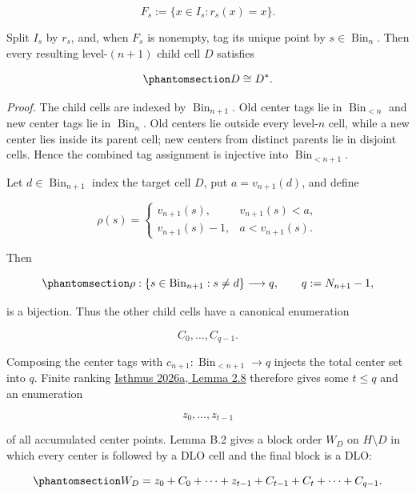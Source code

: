 \documentclass[
  english,
  11pt,
  reqno]{amsart}
\newcounter{none} %
\begin{document}
\[
F_s:=\{x\in I_s:r_s(x)=x\}.
\]

Split \(I_s\) by \(r_s\), and, when \(F_s\) is nonempty, tag its unique
point by \(s\in\operatorname{Bin}_n\). Then every resulting
level-\((n+1)\) child cell \(D\) satisfies

\begin{equation}\protect\phantomsection\label{eq:typefree-child-selfdual}{
D\cong D^*.
}\end{equation}

\emph{Proof.} The child cells are indexed by
\(\operatorname{Bin}_{n+1}\). Old center tags lie in
\(\operatorname{Bin}_{<n}\) and new center tags lie in
\(\operatorname{Bin}_n\). Old centers lie outside every level-\(n\)
cell, while a new center lies inside its parent cell; new centers from
distinct parents lie in disjoint cells. Hence the combined tag
assignment is injective into \(\operatorname{Bin}_{<n+1}\).

Let \(d\in\operatorname{Bin}_{n+1}\) index the target cell \(D\), put
\(a=v_{n+1}(d)\), and define

\[
\rho(s)
=
\begin{cases}
 v_{n+1}(s),&v_{n+1}(s)<a,\\
 v_{n+1}(s)-1,&a<v_{n+1}(s).
\end{cases}
\]

Then

\begin{equation}\protect\phantomsection\label{eq:typefree-remaining-cell-ranking}{
\rho:
\{s\in\operatorname{Bin}_{n+1}:s\ne d\}
\longrightarrow
q,
\qquad
q:=N_{n+1}-1,
}\end{equation}

is a bijection. Thus the other child cells have a canonical enumeration

\[
C_0,\ldots,C_{q-1}.
\]

Composing the center tags with
\(c_{n+1}:\operatorname{Bin}_{<n+1}\to q\) injects the total center set
into \(q\). Finite ranking \hyperref[ref:isthmus2026a]{Isthmus 2026a,
Lemma 2.8} therefore gives some \(t\le q\) and an enumeration

\[
z_0,\ldots,z_{t-1}
\]

of all accumulated center points. Lemma B.2 gives a block order \(W_D\)
on \(H\setminus D\) in which every center is followed by a DLO cell and
the final block is a DLO:

\begin{equation}\protect\phantomsection\label{eq:typefree-localized-complement}{
W_D
=
z_0+C_0+\cdots+z_{t-1}+C_{t-1}
+C_t+\cdots+C_{q-1}.
}\end{equation}
\end{document}
